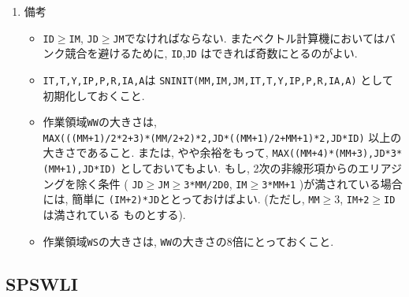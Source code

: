 \documentclass[a4j,fleqn]{jarticle}
\begin{document}
\begin{enumerate}
\item 備考

\begin{itemize}

\item {\tt ID}$\ge${\tt IM}, {\tt JD}$\ge${\tt JM}でなければならない.
   またベクトル計算機においてはバンク競合を避けるために, {\tt ID},{\tt JD}
   はできれば奇数にとるのがよい.

\item {\tt IT,T,Y,IP,P,R,IA,A}は 
      {\tt SNINIT(MM,IM,JM,IT,T,Y,IP,P,R,IA,A)} として初期化しておくこと.\\

\item 作業領域{\tt WW}の大きさは, \\
     {\tt MAX(((MM+1)/2*2+3)*(MM/2+2)*2,JD*((MM+1)/2+MM+1)*2,JD*ID)}
    以上の大きさであること. または, やや余裕をもって,
     {\tt MAX((MM+4)*(MM+3),JD*3*(MM+1),JD*ID)}
    としておいてもよい. もし, 2次の非線形項からのエリアジングを除く条件
     ( {\tt JD}$\ge${\tt JM}$\ge${\tt 3*MM/2D0}, 
      {\tt IM}$\ge${\tt 3*MM+1} )が満されている場合には, 簡単に
      {\tt (IM+2)*JD}ととっておけばよい.
     (ただし, {\tt MM}$\ge 3$, {\tt IM+2}$\ge${\tt ID}は満されている
    ものとする).

\item 作業領域{\tt WS}の大きさは, {\tt WW}の大きさの8倍にとっておくこと.

\end{itemize}

\end{enumerate}

\subsection{SPSWLI}
\end{document}
